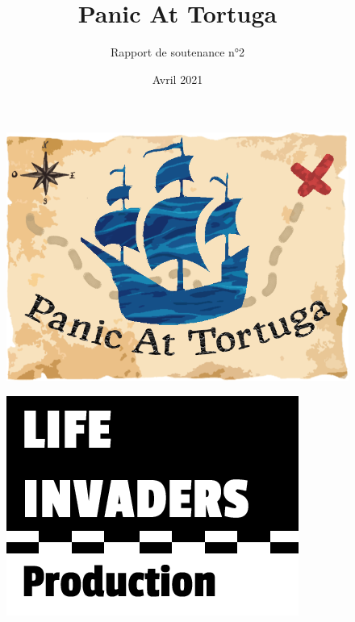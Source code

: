 \documentclass[french, 12pt]{article}
\title{\fontfamily{phv}\selectfont \Huge \textbf{Panic At Tortuga}}
\author{\fontfamily{phv}\Huge{Rapport de soutenance n°2}}
\date{\fontfamily{phv}\selectfont Avril 2021}
\begin{document}
\begin{titlepage}
    \maketitle
    
    \thispagestyle{empty}
    \vspace{20pt}
    \begin{figure}[hbt!]
        \centering
        \includegraphics[scale=0.5]{logo.png}
    \end{figure}
    \vspace{70pt}

    \begin{figure}[hbt!]
        \centering
        \includegraphics[scale=0.4]{logo_lifeinvaders_copie.png}
    \end{figure}
\end{titlepage}
\end{document}
